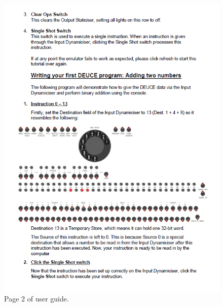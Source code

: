 \documentclass{l4proj}
\begin{document}
\begin{appendices}
\begin{figure}
	\centering
	\includegraphics{images/ug-2}
	\caption{Page 2 of user guide.}
	\label{fig:pg-2}
\end{figure}

\end{appendices}






\end{document}
